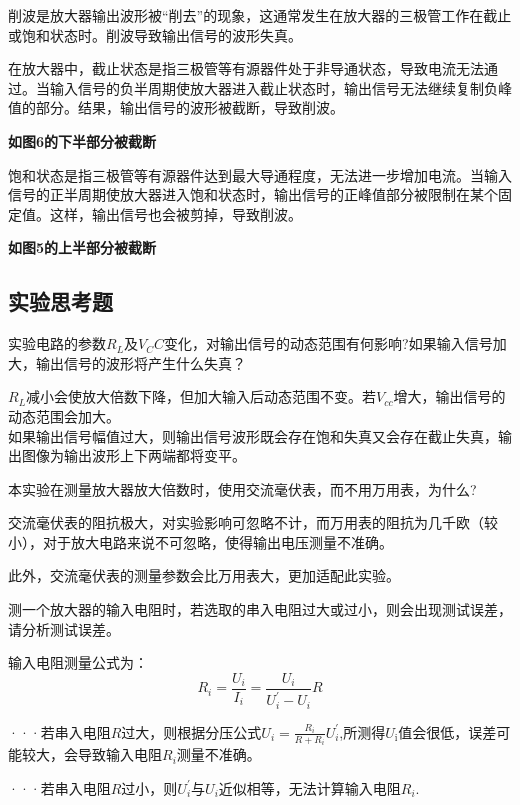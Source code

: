 \documentclass[dvipsnames, svgnames,a4paper,11pt]{article}
\begin{document}
	削波是放大器输出波形被“削去”的现象，这通常发生在放大器的三极管工作在截止或饱和状态时。削波导致输出信号的波形失真。


在放大器中，截止状态是指三极管等有源器件处于非导通状态，导致电流无法通过。当输入信号的负半周期使放大器进入截止状态时，输出信号无法继续复制负峰值的部分。结果，输出信号的波形被截断，导致削波。

\textbf{如图6的下半部分被截断}

饱和状态是指三极管等有源器件达到最大导通程度，无法进一步增加电流。当输入信号的正半周期使放大器进入饱和状态时，输出信号的正峰值部分被限制在某个固定值。这样，输出信号也会被剪掉，导致削波。

\textbf{如图5的上半部分被截断}


	
	\subsection{实验思考题}
	
	\begin{question}
		实验电路的参数$R_L$及$V_CC$变化，对输出信号的动态范围有何影响?如果输入信号加大，输出信号的波形将产生什么失真？
	\end{question}
	$R_L$减小会使放大倍数下降，但加大输入后动态范围不变。若$V_{cc}$增大，输出信号的动态范围会加大。\\
如果输出信号幅值过大，则输出信号波形既会存在饱和失真又会存在截止失真，输出图像为输出波形上下两端都将变平。
	\begin{question}
		本实验在测量放大器放大倍数时，使用交流毫伏表，而不用万用表，为什么?
	\end{question}
	交流毫伏表的阻抗极大，对实验影响可忽略不计，而万用表的阻抗为几千欧（较小），对于放大电路来说不可忽略，使得输出电压测量不准确。

此外，交流毫伏表的测量参数会比万用表大，更加适配此实验。
	\begin{question}
		测一个放大器的输入电阻时，若选取的串入电阻过大或过小，则会出现测试误差，请分析测试误差。
	\end{question}
	输入电阻测量公式为：
$$R_i=\frac{U_i}{I_i}=\frac{U_i}{U_i^{\prime}-U_i}R$$

···若串入电阻$R$过大，则根据分压公式$U_i=\frac{R_i}{R+R_i}U_i^{\prime}$,所测得$U_\mathrm{i}$值会很低，误差可能较大，会导致输入电阻$R_i$测量不准确。

···若串入电阻$R$过小，则$U_i^\prime$与$U_i$近似相等，无法计算输入电阻$R_i.$
	
	
	\clearpage
	
\end{document}
